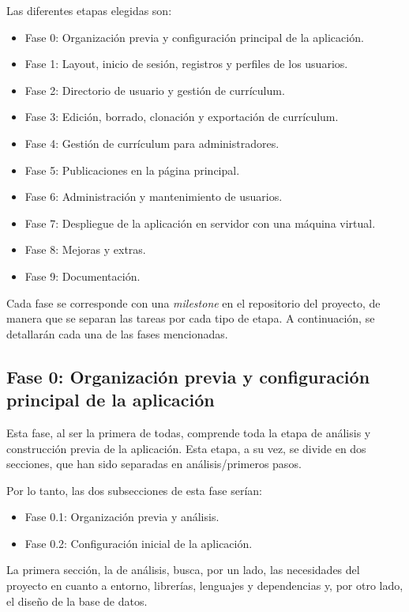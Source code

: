 Las diferentes etapas elegidas son:
\begin{itemize}
\item Fase 0: Organización previa y configuración principal de la aplicación.
\item Fase 1: Layout, inicio de sesión, registros y perfiles de los usuarios.
\item Fase 2: Directorio de usuario y gestión de currículum.
\item Fase 3: Edición, borrado, clonación y exportación de currículum.
\item Fase 4: Gestión de currículum para administradores.
\item Fase 5: Publicaciones en la página principal.
\item Fase 6: Administración y mantenimiento de usuarios.
\item Fase 7: Despliegue de la aplicación en servidor con una máquina virtual.
\item Fase 8: Mejoras y extras.
\item Fase 9: Documentación.
\end{itemize}

Cada fase se corresponde con una \emph{milestone} en el repositorio del proyecto, de manera
que se separan las tareas por cada tipo de etapa.
A continuación, se detallarán cada una de las fases mencionadas.

\subsection{Fase 0: Organización previa y configuración principal de la aplicación}
Esta fase, al ser la primera de todas, comprende toda la etapa de análisis y 
construcción previa de la aplicación. Esta etapa, a su vez, se divide en dos secciones,
que han sido separadas en análisis/primeros pasos.

Por lo tanto, las dos subsecciones de esta fase serían:
\begin{itemize}
\tightlist
\item Fase 0.1: Organización previa y análisis.
\item Fase 0.2: Configuración inicial de la aplicación.
\end{itemize}

La primera sección, la de análisis, busca, por un lado, las necesidades del proyecto en cuanto
a entorno, librerías, lenguajes y dependencias y, por otro lado, el diseño de la base de datos.

